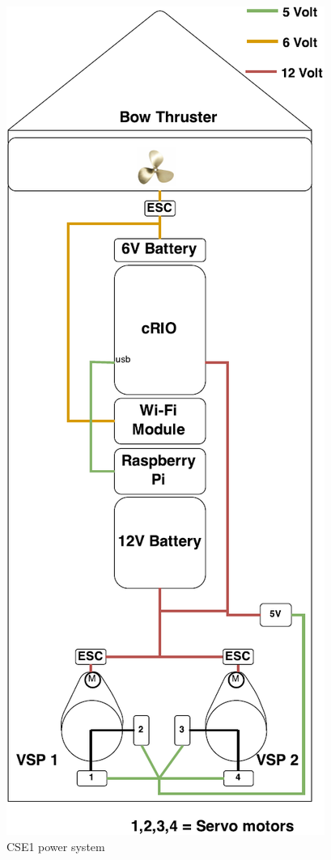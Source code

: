 \documentclass[a4paper,twoside,english]{report}
\begin{document}
\begin{figure}
\begin{centering}
\includegraphics[height=0.4\paperheight]{fig/CSE1_power}
\par\end{centering}
\caption{\label{fig: CSE1 power}CSE1 power system}
\end{figure}
\end{document}
